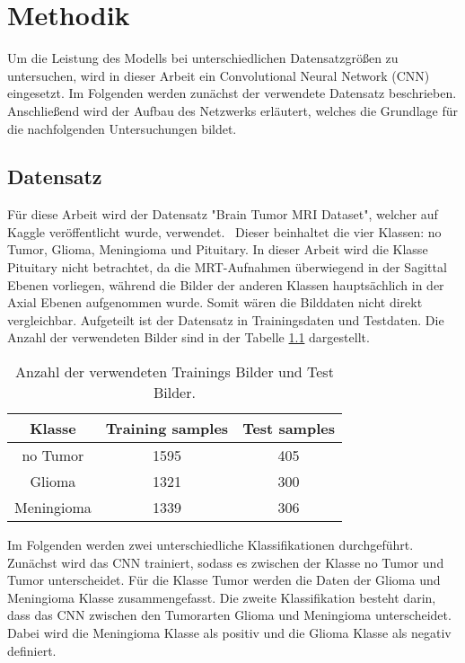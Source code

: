 \chapter{Methodik}\label{sec:methodik}
Um die Leistung des Modells bei unterschiedlichen Datensatzgrößen zu untersuchen, wird in dieser Arbeit ein Convolutional Neural Network (CNN) eingesetzt.
Im Folgenden werden zunächst der verwendete Datensatz beschrieben. 
Anschließend wird der Aufbau des Netzwerks erläutert, welches die Grundlage für die nachfolgenden Untersuchungen bildet.

\section{Datensatz}
Für diese Arbeit wird der Datensatz "Brain Tumor MRI Dataset", welcher auf Kaggle veröffentlicht wurde, verwendet.~\cite{msoud_nickparvar_2021}
Dieser beinhaltet die vier Klassen: no Tumor, Glioma, Meningioma und Pituitary.
In dieser Arbeit wird die Klasse Pituitary nicht betrachtet, da die MRT-Aufnahmen überwiegend in der Sagittal Ebenen vorliegen, während die Bilder der anderen Klassen
hauptsächlich in der Axial Ebenen aufgenommen wurde.
Somit wären die Bilddaten nicht direkt vergleichbar.
Aufgeteilt ist der Datensatz in Trainingsdaten und Testdaten.
Die Anzahl der verwendeten Bilder sind in der Tabelle \ref{tab:daten} dargestellt. 
\begin{table}[H]
    \centering
    \begin{tabular}{c c c}
        \toprule
        Klasse      & Training samples & Test samples \\
        \midrule
        no Tumor    &    1595          & 405 \\
        Glioma      &    1321          & 300 \\
        Meningioma  &    1339          & 306 \\
        \bottomrule
  \end{tabular}
  \caption{Anzahl der verwendeten Trainings Bilder und Test Bilder.}
  \label{tab:daten}
\end{table}
\vspace{-2em}
Im Folgenden werden zwei unterschiedliche Klassifikationen durchgeführt.
Zunächst wird das CNN trainiert, sodass es zwischen der Klasse no Tumor und Tumor unterscheidet. Für die Klasse Tumor
werden die Daten der Glioma und Meningioma Klasse zusammengefasst.
Die zweite Klassifikation besteht darin, dass das CNN zwischen den Tumorarten Glioma und Meningioma unterscheidet.
Dabei wird die Meningioma Klasse als positiv und die Glioma Klasse als negativ definiert.

